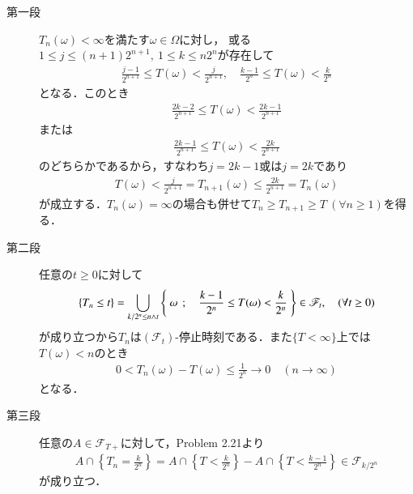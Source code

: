 	\begin{prf}\mbox{}
		\begin{description}
			\item[第一段]
				$T_n(\omega)<\infty$を満たす$\omega \in \Omega$に対し，
				或る$1 \leq j \leq (n+1)2^{n+1},\ 1\leq k \leq n2^n$が存在して
				\begin{align}
					\frac{j-1}{2^{n+1}} \leq T(\omega) < \frac{j}{2^{n+1}},
					\quad \frac{k-1}{2^n} \leq T(\omega) < \frac{k}{2^n}
				\end{align}
				となる．このとき
				\begin{align}
					\frac{2k-2}{2^{n+1}} \leq T(\omega) < \frac{2k-1}{2^{n+1}}
				\end{align}
				または
				\begin{align}
					\frac{2k-1}{2^{n+1}} \leq T(\omega) < \frac{2k}{2^{n+1}}
				\end{align}
				のどちらかであるから，すなわち$j=2k-1$或は$j=2k$であり
				\begin{align}
					T(\omega) < \frac{j}{2^{n+1}} = T_{n+1}(\omega)
					\leq \frac{2k}{2^{n+1}} = T_n(\omega)
				\end{align}
				が成立する．$T_n(\omega) = \infty$の場合も併せて$T_n \geq T_{n+1} \geq T\ (\forall n \geq 1)$を得る．
			
			\item[第二段]
				任意の$t \geq 0$に対して
				\begin{align}
					\{T_n \leq t\}
					= \bigcup_{k/2^n \leq n \wedge t} \left\{\ \omega\ \, ; \quad \frac{k-1}{2^n} \leq T(\omega) < \frac{k}{2^n}\ \right\}
					\in \mathscr{F}_t,
					\quad (\forall t \geq 0)
				\end{align}
				が成り立つから$T_n$は$(\mathscr{F}_t)$-停止時刻である．また$\{T < \infty\}$上では
				$T(\omega) < n$のとき
				\begin{align}
					0 < T_n(\omega) - T(\omega) \leq \frac{1}{2^n} \longrightarrow 0
					\quad (n \longrightarrow \infty)
				\end{align}
				となる．
			
			\item[第三段]
				任意の$A \in \mathscr{F}_{T+}$に対して，Problem 2.21より
				\begin{align}
					A \cap \left\{T_n = \frac{k}{2^n}\right\}
					= A \cap \left\{T < \frac{k}{2^n}\right\}
					- A \cap \left\{T < \frac{k-1}{2^n}\right\}
					\in \mathscr{F}_{k/2^n}
				\end{align}
				が成り立つ．
				\QED
		\end{description}
	\end{prf}